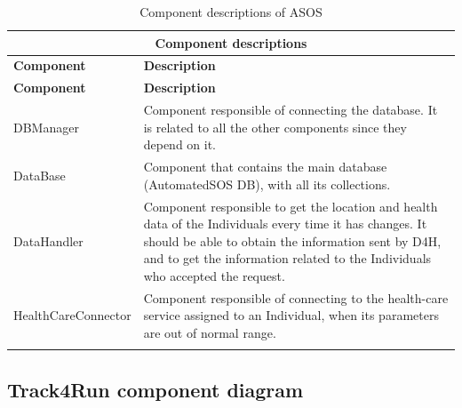 \documentclass[a4paper, hidelinks, 12pt]{report}
\begin{document}
		\begin{longtable}{l p{}}
			\hline\hline
			\multicolumn{2}{c}{\textbf{Component descriptions}} \\
			\hline
			\textbf{Component} & \textbf{Description} \\ [0.5ex]
			\hline
			\endfirsthead
			\hline
			\textbf{Component} & \textbf{Description} \\ [0.5ex]
			\hline
			\endhead
			DBManager & Component responsible of connecting the database. It is related to all the other components since they depend on it.\\
			DataBase & Component that contains the main database (AutomatedSOS DB), with all its collections.\\
			DataHandler & Component responsible to get the location and health data of the Individuals every time it has changes. It should be able to obtain the information sent by D4H, and to get the information related to the Individuals who accepted the request.\\
			HealthCareConnector & Component responsible of connecting to the health-care service assigned to an Individual, when its parameters are out of normal range.\\
			\hline
			\caption{Component descriptions of ASOS}
			\label{table:asos_component_descriptions}
		\end{longtable}
		
	\subsection{Track4Run component diagram}
\end{document}
